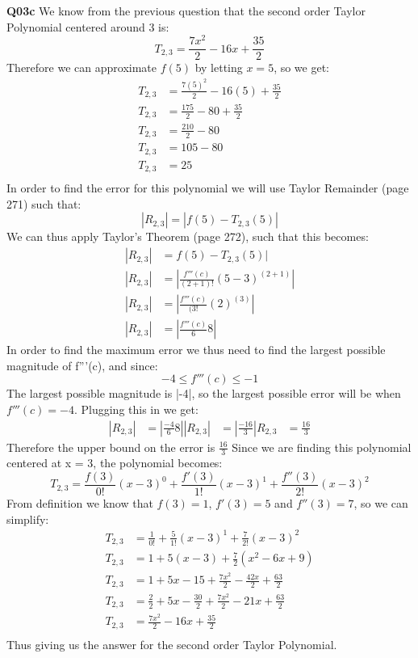 \documentclass[11pt]{article}
\begin{document}
\textbf{Q03c} We know from the previous question that the second order Taylor Polynomial centered around 3 is:
\[ T_{2,3} = \frac{7x^2}{2} - 16x +\frac{35}{2} \]
Therefore we can approximate $f(5)$ by letting $x = 5$, so we get:
\begin{align*}
T_{2,3}& = \frac{7(5)^2}{2} - 16(5) +\frac{35}{2} \\ 
T_{2,3}& = \frac{175}{2} - 80 +\frac{35}{2} \\
T_{2,3}& = \frac{210}{2} - 80\\
T_{2,3}& = 105 - 80  \\
T_{2,3}& = 25  \\
\end{align*}
In order to find the error for this polynomial we will use Taylor Remainder (page 271) such that:
\[ |R_{2,3}| = |f(5) - T_{2,3}(5)| \]
We can thus apply Taylor's Theorem (page 272), such that this becomes:
\begin{align*}
|R_{2,3}| & = f(5) - T_{2,3}(5)|  \\ 
|R_{2,3}| & = |\frac{f'''(c)}{(2+1)!}(5-3)^(2+1)|  \\
|R_{2,3}| & = |\frac{f'''(c)}{(3!}(2)^(3)|   \\
|R_{2,3}| & = |\frac{f'''(c)}{6}8|  
\end{align*}
In order to find the maximum error we thus need to find the largest possible magnitude of f'''(c), and since:
\[ -4 \leq f'''(c) \leq -1 \]
The largest possible magnitude is |-4|, so the largest possible error will be when $f'''(c) = -4$. Plugging this in we get:
\begin{align*}
|R_{2,3}| & = |\frac{-4}{6}8|  
|R_{2,3}| & = |\frac{-16}{3}|  
R_{2,3} & = \frac{16}{3}
\end{align*}
Therefore the upper bound on the error is $\frac{16}{3}$
Since we are finding this polynomial centered at x = 3, the polynomial becomes:
\[ T_{2,3}= \frac{f(3)}{0!}(x-3)^0 + \frac{f'(3)}{1!}(x-3)^1 + \frac{f''(3)}{2!}(x-3)^2  \]
From definition we know that $f(3) = 1$, $f'(3) = 5$ and $f''(3) = 7$, so we can simplify:
\begin{align*}
T_{2,3}& = \frac{1}{0!} + \frac{5}{1!}(x-3)^1 + \frac{7}{2!}(x-3)^2 \\
T_{2,3}& = 1 + 5(x-3) + \frac{7}{2}(x^2-6x+9) \\
T_{2,3}& = 1 + 5x - 15 + \frac{7x^2}{2} - \frac{42x}{2} +\frac{63}{2}  \\
T_{2,3}& = \frac{2}{2} + 5x - \frac{30}{2} + \frac{7x^2}{2} - 21x +\frac{63}{2}  \\
T_{2,3}& = \frac{7x^2}{2} - 16x +\frac{35}{2}  \\
\end{align*}
Thus giving us the answer for the second order Taylor Polynomial. \\
\end{document}
